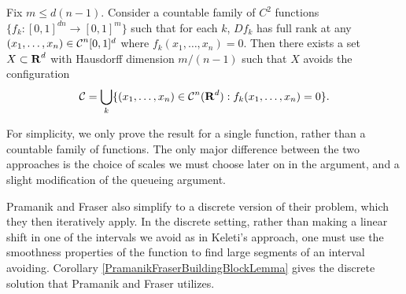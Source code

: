\begin{theorem} \label{pramanikandfrasertheorem}
    Fix $m \leq d(n-1)$. Consider a countable family of $C^2$ functions $\{ f_k : [0,1]^{dn} \to [0,1]^m \}$ such that for each $k$, $Df_k$ has full rank at any $(x_1, \dots, x_n) \in \operatorname{\mathcal{C}}^n[0,1]^d$ where $f_k(x_1, \dots, x_n) = 0$. Then there exists a set $X \subset \operatorname{\mathbf{R}}^d$ with Hausdorff dimension $m/(n-1)$ such that $X$ avoids the configuration
    \[ \operatorname{\mathcal{C}} = \bigcup_k \{ (x_1, \dots, x_n) \in \operatorname{\mathcal{C}}^n(\operatorname{\mathbf{R}}^d): f_k(x_1, \dots, x_n) = 0 \}. \]
\end{theorem}

\begin{remark}
    For simplicity, we only prove the result for a single function, rather than a countable family of functions. The only major difference between the two approaches is the choice of scales we must choose later on in the argument, and a slight modification of the queueing argument.
\end{remark}

Pramanik and Fraser also simplify to a discrete version of their problem, which they then iteratively apply. In the discrete setting, rather than making a linear shift in one of the intervals we avoid as in Keleti's approach, one must use the smoothness properties of the function to find large segments of an interval avoiding. Corollary \ref{PramanikFraserBuildingBlockLemma} gives the discrete solution that Pramanik and Fraser utilizes.

